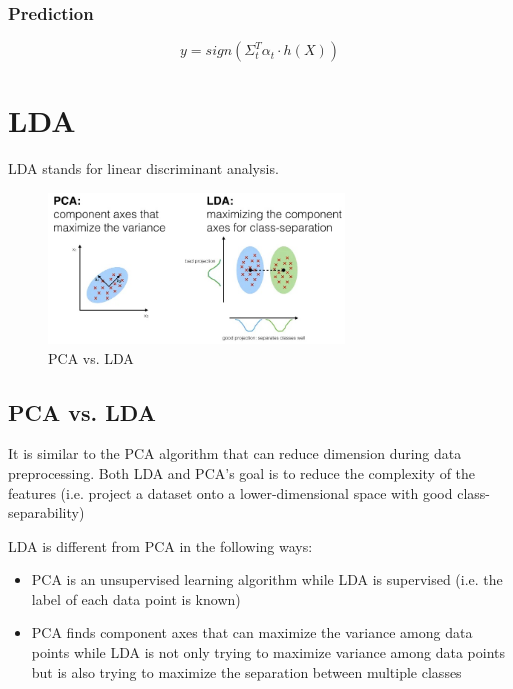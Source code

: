 \documentclass[12pt]{article}
\begin{document}
\subsubsection{Prediction}
$$y = sign(\Sigma_t^T \alpha_t \cdot h(X))$$
\newpage

\section{LDA}

LDA stands for linear discriminant analysis. 

\begin{figure}[htbp]
\begin{center}
\includegraphics[width = 0.7\textwidth]{Images/PCA vs. LDA.jpeg}
\caption{PCA vs. LDA}
\label{default}
\end{center}
\end{figure}

\subsection{PCA vs. LDA}
It is similar to the PCA algorithm that can reduce dimension during data preprocessing. Both LDA and PCA's goal is to reduce the complexity of the features (i.e. project a dataset onto a lower-dimensional space with good class-separability)

LDA is different from PCA in the following ways:
\begin{itemize}
	\item PCA is an unsupervised learning algorithm while LDA is supervised (i.e. the label of each data point is known)
	\item PCA finds component axes that can maximize the variance among data points while LDA is not only trying to maximize variance among data points but is also trying to maximize the separation between multiple classes
\end{itemize}
\end{document}
